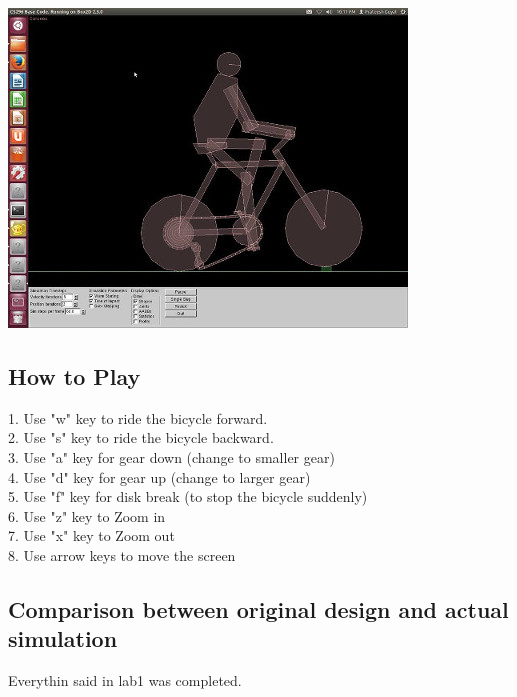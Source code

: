 \documentclass[11pt]{article}
\begin{document}
	\begin{center}
	\includegraphics[scale=0.7]{pic3}
	\end{center}
\subsection{How to Play}
1. Use "w" key to ride the bicycle forward.\\
2. Use "s" key to ride the bicycle backward.\\
3. Use "a" key for gear down (change to smaller gear)\\
4. Use "d" key for gear up (change to larger gear)\\
5. Use "f" key for disk break (to stop the bicycle suddenly)\\
6. Use "z" key to Zoom in\\
7. Use "x" key to Zoom out\\
8. Use arrow keys to move the screen\\
\subsection{Comparison between original design and actual simulation}
Everythin said in lab1 was completed.
\end{document}

